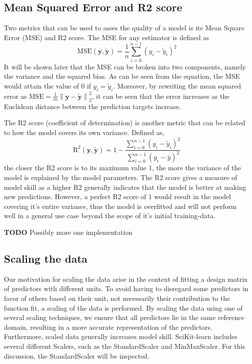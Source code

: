 \documentclass[11pt, a4paper]{article}
\begin{document}
\subsection*{Mean Squared Error and R2 score}
Two metrics that can be used to asses the quality of a model is its Mean Square Error (MSE) and R2 score. The MSE for any estimator is defined as
\[
  \text{MSE}(\boldsymbol{y},\boldsymbol{\tilde{y}}) = \frac{1}{n}
  \sum_{i=0}^{n-1}(y_i-\tilde{y}_i)^2
\]
It will be shown later that the MSE can be broken into two components, namely the variance and the squared bias. As can be seen from the equation, the MSE would attain the value of 0 if $y_i = \tilde{y}_i$. Moreover, by rewriting the mean squared error as $\text{MSE} = \frac{1}{m}\left\lVert \bm{y} - \bm{\tilde{y}}\right\rVert_2^2$, it can be seen that the error increases as the Euclidean distance between the prediction targets increase. \cite{Goodfellow2016}

The R2 score (coefficient of determination) is another metric that can be related to how the model covers its own variance. Defined as,
\[
  \text{R}^2(\boldsymbol{y}, \tilde{\boldsymbol{y}}) = 1 - \frac{\sum_{i=0}^{n - 1} (y_i - \tilde{y}_i)^2}{\sum_{i=0}^{n - 1} (y_i - \bar{y})^2}
\] the closer the R2 score is to its maximum value 1, the more the variance of the model is explained by the model parameters. The R2 score gives a measure of model skill as a higher R2 generally indicates that the model is better at making new predictions. However, a perfect R2 score of 1 would result in the model covering it's entire variance, thus the model is overfitted and will not perform well in a general use case beyond the scope of it's initial training-data.

\textbf{TODO} Possibly more one implementation

\subsection*{Scaling the data}
Our motivation for scaling the data arise in the context of fitting a design matrix of predictors with different units. To avoid having to disregard some predictors in favor of others based on their unit, not necessarily their contribution to the function fit, a scaling of the data is performed. By scaling the data using one of several scaling techniques, we ensure that all predictors lie in the same reference domain, resulting in a more accurate representation of the predictors. Furthermore, scaled data generally increases model skill. SciKit-learn includes several different Scalers, such as the StandardScaler and MinMaxScaler. \cite{scikit-learn} For this discussion, the StandardScaler will be inspected.
\end{document}
